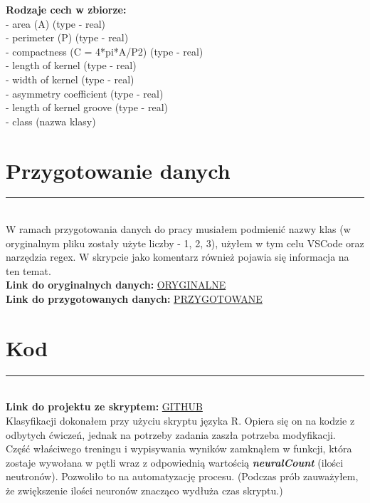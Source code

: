 \documentclass[a4paper,12pt]{article}
\newcommand{\linia}{\rule{\linewidth}{0.5pt}}
\theoremstyle{mytheor}
\begin{document}
\textbf{Rodzaje cech w zbiorze:}\\
 - area (A) (type - real)\\
 - perimeter (P) (type - real)\\
 - compactness (C = 4*pi*A/P2) (type - real)\\
 - length of kernel (type - real)\\
 - width of kernel (type - real)\\
 - asymmetry coefficient (type - real)\\
 - length of kernel groove (type - real)\\
 - class (nazwa klasy)\\

\section*{Przygotowanie danych}
\linia\\
 W ramach przygotowania danych do pracy musiałem podmienić nazwy klas (w oryginalnym pliku zostały użyte liczby - 1, 2, 3), użyłem w tym celu VSCode oraz narzędzia regex. W skrypcie jako komentarz również pojawia się informacja na ten temat.\\
 
 \textbf{Link do oryginalnych danych:} \textcolor{red}{\href{https://github.com/bvdzynski/up_ai-lab/blob/master/lab5_project_seeds/data/seeds_dataset_original.txt}{ORYGINALNE}}\\
 
 \textbf{Link do przygotowanych danych:} \textcolor{red}{\href{https://github.com/bvdzynski/up_ai-lab/blob/master/lab5_project_seeds/data/seeds_dataset_changed.data}{PRZYGOTOWANE}}\\
 
\section*{Kod}
\linia\\
\textbf{Link do projektu ze skryptem:} \textcolor{red}{\href{https://github.com/bvdzynski/up_ai-lab/tree/master/lab5_project_seeds}{GITHUB}}\\

Klasyfikacji dokonałem przy użyciu skryptu języka R.
Opiera się on na kodzie z odbytych ćwiczeń, jednak na potrzeby zadania zaszła potrzeba modyfikacji.\\

Część właściwego treningu i wypisywania wyników zamknąłem w funkcji, która zostaje wywołana w pętli wraz z odpowiednią wartością \textbf{\emph{neuralCount}} (ilości neutronów). Pozwoliło to na automatyzację procesu. (Podczas prób zauważyłem, że zwiększenie ilości neuronów znacząco wydłuża czas skryptu.)\\
\end{document}
